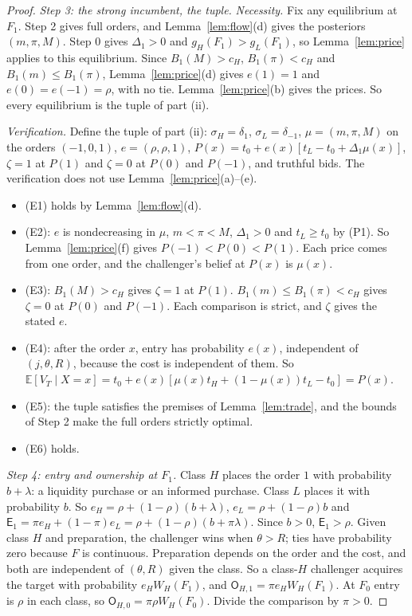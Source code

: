 \documentclass[11pt]{article}
\theoremstyle{definition}
\newcommand{\E}{\mathbb E}
\newcommand{\Ent}{\mathsf E}
\newcommand{\Own}{\mathsf O}
\begin{document}
\begin{proof}
\emph{Step 3: the strong incumbent, the tuple.} \emph{Necessity.} Fix any equilibrium at $F_1$. Step 2 gives
full orders, and Lemma~\ref{lem:flow}(d) gives the posteriors $(m,\pi,M)$. Step 0 gives $\Delta_1>0$ and
$g_H(F_1)>g_L(F_1)$, so Lemma~\ref{lem:price} applies to this equilibrium. Since $B_1(M)>c_H$, $B_1(\pi)<c_H$ and
$B_1(m)\le B_1(\pi)$, Lemma~\ref{lem:price}(d) gives $e(1)=1$ and $e(0)=e(-1)=\rho$, with no tie.
Lemma~\ref{lem:price}(b) gives the prices. So every equilibrium is the tuple of part (ii).

\emph{Verification.} Define the tuple of part (ii): $\sigma_H=\delta_1$, $\sigma_L=\delta_{-1}$,
$\mu=(m,\pi,M)$ on the orders $(-1,0,1)$, $e=(\rho,\rho,1)$, $P(x)=t_0+e(x)[t_L-t_0+\Delta_1\mu(x)]$, $\zeta=1$ at
$P(1)$ and $\zeta=0$ at $P(0)$ and $P(-1)$, and truthful bids. The verification does not use Lemma~\ref{lem:price}(a)--(e).
\begin{itemize}
\item (E1) holds by Lemma~\ref{lem:flow}(d).
\item (E2): $e$ is nondecreasing in $\mu$, $m<\pi<M$, $\Delta_1>0$ and $t_L\ge t_0$ by (P1). So
  Lemma~\ref{lem:price}(f) gives $P(-1)<P(0)<P(1)$. Each price comes from one order, and the challenger's belief at
  $P(x)$ is $\mu(x)$.
\item (E3): $B_1(M)>c_H$ gives $\zeta=1$ at $P(1)$. $B_1(m)\le B_1(\pi)<c_H$ gives $\zeta=0$ at $P(0)$ and
  $P(-1)$. Each comparison is strict, and $\zeta$ gives the stated $e$.
\item (E4): after the order $x$, entry has probability $e(x)$, independent of $(j,\theta,R)$, because the cost is
  independent of them. So $\E[V_T\mid X=x]=t_0+e(x)[\mu(x)t_H+(1-\mu(x))t_L-t_0]=P(x)$.
\item (E5): the tuple satisfies the premises of Lemma~\ref{lem:trade}, and the bounds of Step 2 make the full
  orders strictly optimal.
\item (E6) holds.
\end{itemize}

\emph{Step 4: entry and ownership at $F_1$.} Class $H$ places the order $1$ with probability $b+\lambda$: a
liquidity purchase or an informed purchase. Class $L$ places it with probability $b$. So
$e_H=\rho+(1-\rho)(b+\lambda)$, $e_L=\rho+(1-\rho)b$ and $\Ent_1=\pi e_H+(1-\pi)e_L=\rho+(1-\rho)(b+\pi\lambda)$.
Since $b>0$, $\Ent_1>\rho$. Given class $H$ and preparation, the challenger wins when $\theta>R$; ties have
probability zero because $F$ is continuous. Preparation depends on the order and the cost, and both are
independent of $(\theta,R)$ given the class. So a class-$H$ challenger acquires the target with probability
$e_HW_H(F_1)$, and $\Own_{H,1}=\pi e_HW_H(F_1)$. At $F_0$ entry is $\rho$ in each class, so
$\Own_{H,0}=\pi\rho W_H(F_0)$. Divide the comparison by $\pi>0$.


\end{proof}
\end{document}
